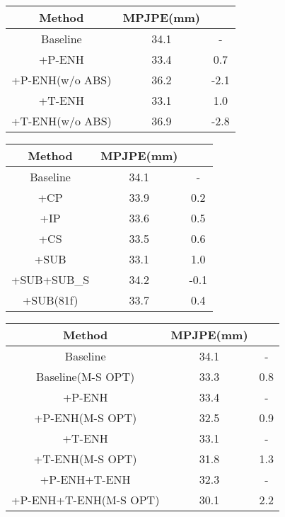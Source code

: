 \documentclass[sigconf]{acmart}
\begin{document}
\begin{multicols}{2}
\begin{center}
    \vspace{0.3cm}
    \begin{tabular}{ccc}

    \toprule
    Method & MPJPE(mm)  &  \\
    \midrule
    Baseline & 34.1&-  \\
    +P-ENH & 33.4&0.7  \\
    +P-ENH(w/o ABS) & 36.2&-2.1  \\
    +T-ENH & 33.1&1.0  \\
    +T-ENH(w/o ABS) & 36.9&-2.8  \\

    \bottomrule
    \end{tabular}
    \vspace{0.5cm}
  \label{tab6}
\end{center}

\begin{center}
\centering
    \begin{tabular}{ccc}
    \toprule
    Method & MPJPE(mm)  &  \\
    \midrule
    Baseline & 34.1&-  \\
    +CP & 33.9&0.2\\
    +IP & 33.6&0.5\\
    +CS & 33.5&0.6\\
    +SUB & 33.1&1.0  \\
    +SUB+SUB\_S & 34.2&-0.1  \\
    +SUB(81f)& 33.7&0.4 \\
    \bottomrule
    \end{tabular}
     \vspace{0.5cm}
  \label{tab5}
\end{center}

\begin{center}
\centering
    \begin{tabular}{ccc}
    \toprule
    Method & MPJPE(mm)  &  \\
    \midrule
    Baseline & 34.1&-  \\
    Baseline(M-S OPT) & 33.3&0.8  \\
    \midrule
    +P-ENH & 33.4&-  \\
    +P-ENH(M-S OPT) & 32.5&0.9  \\
    \midrule
    +T-ENH & 33.1&-  \\
    +T-ENH(M-S OPT) & 31.8&1.3  \\
    \midrule
    +P-ENH+T-ENH &32.3&- \\
    +P-ENH+T-ENH(M-S OPT)&30.1 & 2.2\\
    \bottomrule
    \end{tabular}
    \vspace{0.5cm}
  \label{tab7}
\end{center}


\end{multicols}
\end{document}
